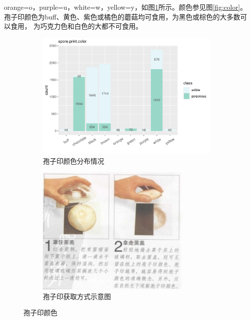 \documentclass[lang=cn,11pt,a4paper,cite=super]{elegantpaper}
\begin{document}
\begin{enumerate}
   orange=o，purple=u，white=w，yellow=y，如图\ref{fig:spcol}所示。颜色参见图\ref{fig:color}。
   孢子印颜色为buff、黄色、紫色或橘色的蘑菇均可食用，为黑色或棕色的大多数可以食用，
   为巧克力色和白色的大都不可食用。
   \begin{figure}[bth]
      \begin{subfigure}[b]{0.59\textwidth}
        \centering
        \includegraphics[width=\linewidth]{img/sporeprintcolor-1.pdf}  
      \caption{孢子印颜色分布情况}
      \end{subfigure}
      \begin{subfigure}[b]{0.4\textwidth}
        \centering
        \includegraphics[width=\linewidth,height=2.5in]{img/spprint.PNG}  
        \caption{孢子印获取方式示意图}
      \end{subfigure}
      \caption{孢子印颜色}
      \label{fig:spcol}
   \end{figure}


\end{enumerate}
\end{document}

